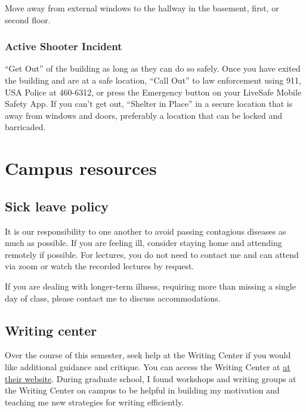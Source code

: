 \documentclass[11pt,]{article}
\begin{document}
Move away from external windows to the hallway in the basement, first,
or second floor.

\subsubsection{Active Shooter Incident}\label{active-shooter-incident}

``Get Out'' of the building as long as they can do so safely. Once you
have exited the building and are at a safe location, ``Call Out'' to law
enforcement using 911, USA Police at 460-6312, or press the Emergency
button on your LiveSafe Mobile Safety App. If you can't get out,
``Shelter in Place'' in a secure location that is away from windows and
doors, preferably a location that can be locked and barricaded.

\section{Campus resources}\label{campus-resources}

\subsection{Sick leave policy}\label{sick-leave-policy}

It is our responsibility to one another to avoid passing contagious
diseases as much as possible. If you are feeling ill, consider staying
home and attending remotely if possible. For lectures, you do not need
to contact me and can attend via zoom or watch the recorded lectures by
request.

If you are dealing with longer-term illness, requiring more than missing
a single day of class, please contact me to discuss accommodations.

\subsection{Writing center}\label{writing-center}

Over the course of this semester, seek help at the Writing Center if you
would like additional guidance and critique. You can access the Writing
Center at
\href{https://www.southalabama.edu/departments/academicsuccess/cae/how.it.works.html}{at
their website}. During graduate school, I found workshops and writing
groups at the Writing Center on campus to be helpful in building my
motivation and teaching me new strategies for writing efficiently.
\end{document}
